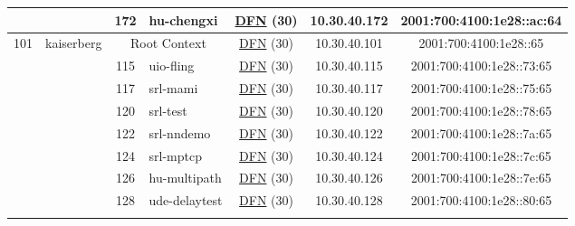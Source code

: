 \begin{small}
\begin{center}
\begin{longtable}{|c|c|c|c|c|c|c|c|}
  &  & \tiny{172} & \multicolumn{1}{|l|}{\tiny{hu-chengxi}} & \multicolumn{2}{|c|}{\tiny{\href{https://www.dfn.de}{DFN} (30)}} & \tiny{10.30.40.172} & \tiny{2001:700:4100:1e28::ac:64} \\ \hline
 \multirow{29}{*}{\tiny{101}} & \multicolumn{1}{|l|}{\multirow{29}{*}{\tiny{kaiserberg}}} & \multicolumn{2}{|c|}{\tiny{Root Context}} & \multicolumn{2}{|c|}{\tiny{\href{https://www.dfn.de}{DFN} (30)}} & \tiny{10.30.40.101} & \tiny{2001:700:4100:1e28::65} \\* \cline{3-3}\cline{4-4}\cline{5-5}\cline{6-6}\cline{7-7}\cline{8-8}
  &  & \tiny{115} & \multicolumn{1}{|l|}{\tiny{uio-fling}} & \multicolumn{2}{|c|}{\tiny{\href{https://www.dfn.de}{DFN} (30)}} & \tiny{10.30.40.115} & \tiny{2001:700:4100:1e28::73:65} \\* \cline{3-3}\cline{4-4}\cline{5-5}\cline{6-6}\cline{7-7}\cline{8-8}
  &  & \tiny{117} & \multicolumn{1}{|l|}{\tiny{srl-mami}} & \multicolumn{2}{|c|}{\tiny{\href{https://www.dfn.de}{DFN} (30)}} & \tiny{10.30.40.117} & \tiny{2001:700:4100:1e28::75:65} \\* \cline{3-3}\cline{4-4}\cline{5-5}\cline{6-6}\cline{7-7}\cline{8-8}
  &  & \tiny{120} & \multicolumn{1}{|l|}{\tiny{srl-test}} & \multicolumn{2}{|c|}{\tiny{\href{https://www.dfn.de}{DFN} (30)}} & \tiny{10.30.40.120} & \tiny{2001:700:4100:1e28::78:65} \\* \cline{3-3}\cline{4-4}\cline{5-5}\cline{6-6}\cline{7-7}\cline{8-8}
  &  & \tiny{122} & \multicolumn{1}{|l|}{\tiny{srl-nndemo}} & \multicolumn{2}{|c|}{\tiny{\href{https://www.dfn.de}{DFN} (30)}} & \tiny{10.30.40.122} & \tiny{2001:700:4100:1e28::7a:65} \\* \cline{3-3}\cline{4-4}\cline{5-5}\cline{6-6}\cline{7-7}\cline{8-8}
  &  & \tiny{124} & \multicolumn{1}{|l|}{\tiny{srl-mptcp}} & \multicolumn{2}{|c|}{\tiny{\href{https://www.dfn.de}{DFN} (30)}} & \tiny{10.30.40.124} & \tiny{2001:700:4100:1e28::7c:65} \\* \cline{3-3}\cline{4-4}\cline{5-5}\cline{6-6}\cline{7-7}\cline{8-8}
  &  & \tiny{126} & \multicolumn{1}{|l|}{\tiny{hu-multipath}} & \multicolumn{2}{|c|}{\tiny{\href{https://www.dfn.de}{DFN} (30)}} & \tiny{10.30.40.126} & \tiny{2001:700:4100:1e28::7e:65} \\* \cline{3-3}\cline{4-4}\cline{5-5}\cline{6-6}\cline{7-7}\cline{8-8}
  &  & \tiny{128} & \multicolumn{1}{|l|}{\tiny{ude-delaytest}} & \multicolumn{2}{|c|}{\tiny{\href{https://www.dfn.de}{DFN} (30)}} & \tiny{10.30.40.128} & \tiny{2001:700:4100:1e28::80:65} \\* \cline{3-3}\cline{4-4}\cline{5-5}\cline{6-6}\cline{7-7}\cline{8-8}

\end{longtable}
\end{center}
\end{small}
